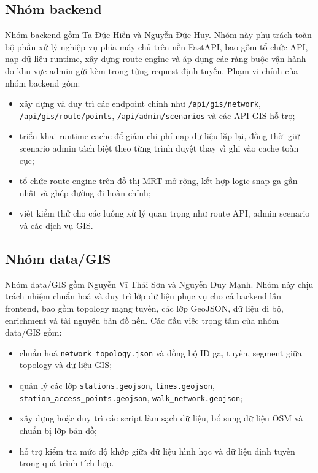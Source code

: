 \documentclass[../DoAn.tex]{subfiles}
\begin{document}
\subsection{Nhóm backend}
Nhóm backend gồm Tạ Đức Hiển và Nguyễn Đức Huy.
Nhóm này phụ trách toàn bộ phần xử lý nghiệp vụ phía máy chủ trên nền FastAPI, bao gồm tổ chức API, nạp dữ liệu runtime, xây dựng route engine và áp dụng các ràng buộc vận hành do khu vực admin gửi kèm trong từng request định tuyến.
Phạm vi chính của nhóm backend gồm:
\begin{itemize}
    \item xây dựng và duy trì các endpoint chính như \texttt{/api/gis/network}, \texttt{/api/gis/route/points}, \texttt{/api/admin/scenarios} và các API GIS hỗ trợ;
    \item triển khai runtime cache để giảm chi phí nạp dữ liệu lặp lại, đồng thời giữ scenario admin tách biệt theo từng trình duyệt thay vì ghi vào cache toàn cục;
    \item tổ chức route engine trên đồ thị MRT mở rộng, kết hợp logic snap ga gần nhất và ghép đường đi hoàn chỉnh;
    \item viết kiểm thử cho các luồng xử lý quan trọng như route API, admin scenario và các dịch vụ GIS.
\end{itemize}

\subsection{Nhóm data/GIS}
Nhóm data/GIS gồm Nguyễn Vĩ Thái Sơn và Nguyễn Duy Mạnh.
Nhóm này chịu trách nhiệm chuẩn hoá và duy trì lớp dữ liệu phục vụ cho cả backend lẫn frontend, bao gồm topology mạng tuyến, các lớp GeoJSON, dữ liệu đi bộ, enrichment và tài nguyên bản đồ nền.
Các đầu việc trọng tâm của nhóm data/GIS gồm:
\begin{itemize}
    \item chuẩn hoá \texttt{network\_topology.json} và đồng bộ ID ga, tuyến, segment giữa topology và dữ liệu GIS;
    \item quản lý các lớp \texttt{stations.geojson}, \texttt{lines.geojson}, \texttt{station\_access\_points.geojson}, \texttt{walk\_network.geojson};
    \item xây dựng hoặc duy trì các script làm sạch dữ liệu, bổ sung dữ liệu OSM và chuẩn bị lớp bản đồ;
    \item hỗ trợ kiểm tra mức độ khớp giữa dữ liệu hình học và dữ liệu định tuyến trong quá trình tích hợp.
\end{itemize}
\end{document}
